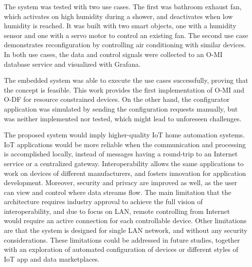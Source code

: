 The system was tested with two use cases. The first was bathroom exhaust fan, which activates on high humidity during a shower, and deactivates when low humidity is reached. It was built with two smart objects, one with a humidity sensor and one with a servo motor to control an existing fan. The second use case demonstrates reconfiguration by controlling air conditioning with similar devices. In both use cases, the data and control signals were collected to an O-MI database service and visualized with Grafana.

The embedded system was able to execute the use cases successfully, proving that the concept is feasible. This work provides the first implementation of O-MI and O-DF for resource constrained devices. On the other hand, the configurator application was simulated by sending the configuration requests manually, but was neither implemented nor tested, which might lead to unforeseen challenges.

The proposed system would imply higher-quality IoT home automation systems. IoT applications would be more reliable when the communication and processing is accomplished locally, instead of messages having a round-trip to an Internet service or a centralized gateway. Interoperability allows the same applications to work on devices of different manufacturers, and fosters innovation for application development. Moreover, security and privacy are improved as well, as the user can view and control where data streams flow. The main limitation that the architecture requires industry approval to achieve the full vision of interoperability, and due to focus on LAN, remote controlling from Internet would require an active connection for each controllable device. Other limitations are that the system is designed for single LAN network, and without any security considerations. These limitations could be addressed in future studies, together with an exploration of automated configuration of devices or different styles of IoT app and data marketplaces.




%
%
